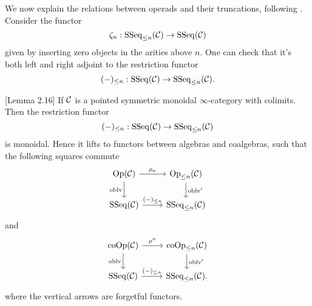 We now explain the relations between operads and their truncations, following \cite{Heuts_Koszul}.
Consider the functor 
$$
\zeta_n: \operatorname{SSeq}_{\leq n}({\mathcal{C}}) \to \operatorname{SSeq}({\mathcal{C}})
$$
given by inserting zero objects in the arities above $n$. One can check that it's both left and right adjoint to the restriction functor
$$
(-)_{\leq n}: \operatorname{SSeq}({\mathcal{C}}) \to 
\operatorname{SSeq}_{\leq n}({\mathcal{C}}).
$$

\begin{lemma}
	\cite{Hadrianphdthesis}[Lemma 2.16]
	If ${\mathcal{C}}$ is a pointed symmetric monoidal $\infty$-category with colimits.
	Then the restriction functor
$$
(-)_{\leq n}: \operatorname{SSeq}({\mathcal{C}}) \to 
\operatorname{SSeq}_{\leq n}({\mathcal{C}})
$$
	is monoidal. Hence it lifts to functors between algebras and coalgebras,
	such that the following squares commute
\[
\begin{tikzcd}
	\Opd(\CC)  & 
	\operatorname{Op}_{\leq n}(\CC)\\
	\SSeq(\CC) & \SSeq_{\leq n}(\CC)
	\arrow[from=1-1, to= 1-2, "\rho_n"]
	\arrow[from=1-1, to=2-1, "\oblv" left]
	\arrow[from=1-2, to=2-2, "\oblv'" ]
	\arrow[from=2-1, to= 2-2, "(-)_{\leq n}"]
\end{tikzcd}
\]
and
\[
\begin{tikzcd}
	 \Coop(\CC)  & 
	\operatorname{coOp}_{\leq n}(\CC)\\
	\SSeq(\CC) & \SSeq_{\leq n}(\CC)
	\arrow[from=1-1, to= 1-2, "\rho^n"]
	\arrow[from=1-1, to=2-1, "\oblv" left]
	\arrow[from=1-2, to=2-2, "\oblv'" ]
	\arrow[from=2-1, to= 2-2, "(-)_{\leq n}"].
\end{tikzcd}
\]
where the vertical arrows are forgetful functors.
\end{lemma}

